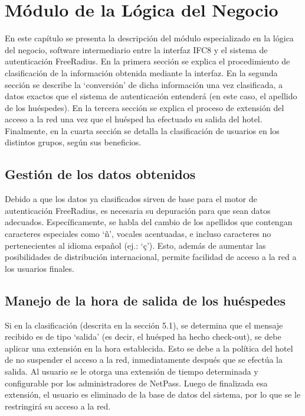\chapter{Módulo de la Lógica del Negocio}\label{chapter:Módulo de la Lógica del Negocio}

		En este capítulo se presenta la descripción del módulo especializado en la lógica del negocio, software intermediario entre la interfaz IFC8 y el sistema de autenticación FreeRadius. En la primera sección se explica el procedimiento de clasificación de la información obtenida mediante la interfaz. En la segunda sección se describe la ‘conversión’ de dicha información una vez clasificada, a datos exactos que el sistema de autenticación entenderá (en este caso, el apellido de los huéspedes). En la tercera sección se explica el proceso de extensión del acceso a la red una vez que el huésped ha efectuado su salida del hotel. Finalmente, en la cuarta sección se detalla la clasificación de usuarios en los distintos grupos, según sus beneficios.

\section{Gestión de los datos obtenidos} \label{sect:Gestión de los datos obtenidos}
		Debido a que los datos ya clasificados sirven de base para el motor de autenticación FreeRadius, es necesaria su depuración para que sean datos adecuados. Específicamente, se habla del cambio de los apellidos que contengan caracteres especiales como ‘ñ’, vocales acentuadas, e incluso caracteres no pertenecientes al idioma español (ej.: ‘ç’). Esto, además de aumentar las posibilidades de distribución internacional, permite facilidad de acceso a la red a los usuarios finales. 
		
\section{Manejo de la hora de salida de los huéspedes} \label{sect:Manejo de la hora de salida de los huéspedes}
		Si en la clasificación (descrita en la sección 5.1), se determina que el mensaje recibido es de tipo ‘salida’ (es decir, el huésped ha hecho check-out), se debe aplicar una extensión en la hora establecida. Esto se debe a la política del hotel de no suspender el acceso a la red, inmediatamente después que se efectúa la salida. Al usuario se le otorga una extensión de tiempo determinada y configurable por los administradores de NetPass. Luego de finalizada esa extensión, el usuario es eliminado de la base de datos del sistema, por lo que se le restringirá su acceso a la red.
		
